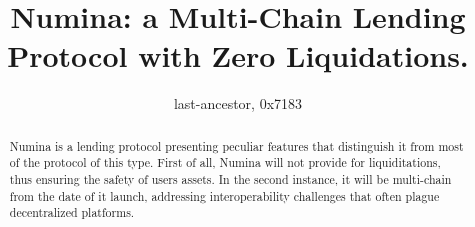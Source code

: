 \documentclass[12pt]{paper}
\title{Numina: a Multi-Chain Lending Protocol with Zero Liquidations.}
\author{last-ancestor, 0x7183}
\date{}
\begin{document}
\maketitle


\begin{abstract}
	Numina is a lending protocol presenting peculiar features that distinguish it from most of the protocol of this type. First of all, Numina will not provide for liquiditations, thus ensuring the safety of users assets. In the second instance, it will be multi-chain from the date of it launch,  addressing interoperability challenges that often plague decentralized platforms.
\end{abstract}
	
\end{document}
